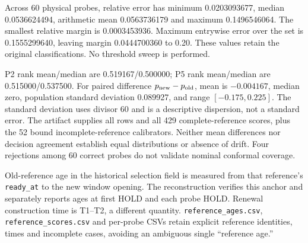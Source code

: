 \documentclass[11pt,a4paper]{article}
\begin{document}
Across 60 physical probes, relative error has minimum 0.0203093677, median 0.0536624494, arithmetic mean 0.0563736179 and maximum 0.1496546064. The smallest relative margin is 0.0003453936. Maximum entrywise error over the set is 0.1555299640, leaving margin 0.0444700360 to 0.20. These values retain the original classifications. No threshold sweep is performed.

P2 rank mean/median are 0.519167/0.500000; P5 rank mean/median are 0.515000/0.537500. For paired difference $p_{\rm new}-p_{\rm old}$, mean is $-0.004167$, median zero, population standard deviation 0.089927, and range $[-0.175,0.225]$. The standard deviation uses divisor 60 and is a descriptive dispersion, not a standard error. The artifact supplies all rows and all 429 complete-reference scores, plus the 52 bound incomplete-reference calibrators. Neither mean differences nor decision agreement establish equal distributions or absence of drift. Four rejections among 60 correct probes do not validate nominal conformal coverage.

Old-reference age in the historical selection field is measured from that reference's \texttt{ready\_at} to the new window opening. The reconstruction verifies this anchor and separately reports ages at first HOLD and each probe HOLD. Renewal construction time is T1--T2, a different quantity. \texttt{reference\_ages.csv}, \texttt{reference\_scores.csv} and per-probe CSVs retain explicit reference identities, times and incomplete cases, avoiding an ambiguous single ``reference age.''
\end{document}
